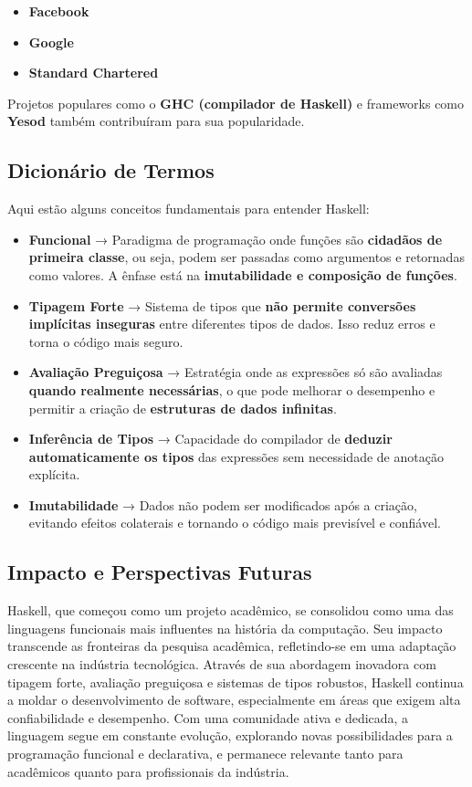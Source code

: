 \begin{itemize}
    \item \textbf{Facebook}
    \item \textbf{Google}
    \item \textbf{Standard Chartered}
\end{itemize}

Projetos populares como o \textbf{GHC (compilador de Haskell)} e frameworks como \textbf{Yesod} também contribuíram para sua popularidade.

\subsection{Dicionário de Termos}

Aqui estão alguns conceitos fundamentais para entender Haskell:

\begin{itemize}
    \item \textbf{Funcional} → Paradigma de programação onde funções são \textbf{cidadãos de primeira classe}, ou seja, podem ser passadas como argumentos e retornadas como valores. A ênfase está na \textbf{imutabilidade e composição de funções}.
    \item \textbf{Tipagem Forte} → Sistema de tipos que \textbf{não permite conversões implícitas inseguras} entre diferentes tipos de dados. Isso reduz erros e torna o código mais seguro.
    \item \textbf{Avaliação Preguiçosa} → Estratégia onde as expressões só são avaliadas \textbf{quando realmente necessárias}, o que pode melhorar o desempenho e permitir a criação de \textbf{estruturas de dados infinitas}.
    \item \textbf{Inferência de Tipos} → Capacidade do compilador de \textbf{deduzir automaticamente os tipos} das expressões sem necessidade de anotação explícita.
    \item \textbf{Imutabilidade} → Dados não podem ser modificados após a criação, evitando efeitos colaterais e tornando o código mais previsível e confiável.
\end{itemize}

\subsection{Impacto e Perspectivas Futuras}

Haskell, que começou como um projeto acadêmico, se consolidou como uma das linguagens funcionais mais influentes na história da computação. Seu impacto transcende as fronteiras da pesquisa acadêmica, refletindo-se em uma adaptação crescente na indústria tecnológica. Através de sua abordagem inovadora com tipagem forte, avaliação preguiçosa e sistemas de tipos robustos, Haskell continua a moldar o desenvolvimento de software, especialmente em áreas que exigem alta confiabilidade e desempenho. Com uma comunidade ativa e dedicada, a linguagem segue em constante evolução, explorando novas possibilidades para a programação funcional e declarativa, e permanece relevante tanto para acadêmicos quanto para profissionais da indústria.
